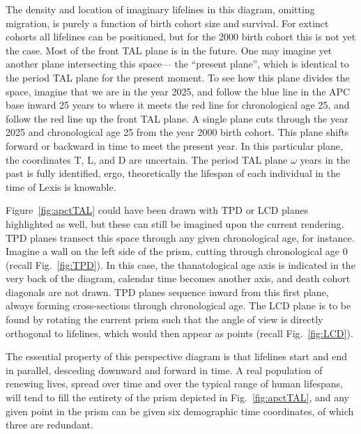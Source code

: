 \documentclass[12pt,oneside,a4paper,doublespacing]{article} %
\theoremstyle{definition}
\begin{document}
The density and location of imaginary lifelines in this diagram, omitting
migration, is purely a function of birth cohort size and survival. For extinct
cohorts all lifelines can be positioned, but for the 2000 birth cohort this is
not yet the case. Most of the front TAL plane is in the future. One may imagine
yet another plane intersecting this space--- the ``present plane'', which is
identical to the period TAL plane for the present moment. To see how this plane
divides the space, imagine that we are in the year 2025, and follow the blue
line in the APC base inward 25 years to where it meets the red line for chronological age 25, and follow the
red line up the front TAL plane. A single plane cuts through the year
2025 and chronological age 25 from the year 2000 birth cohort. This plane
shifts forward or backward in time to meet the present year. In this particular
plane, the coordinates T, L, and D are uncertain. The period TAL plane $\omega$
years in the past is fully identified, ergo, theoretically the lifespan of each
individual in the time of Lexis is knowable. 

Figure~\ref{fig:apctTAL} could have been drawn with TPD or LCD planes highlighted
as well, but these can still be imagined upon the current rendering. TPD planes
transect this space through any given chronological age, for instance. Imagine a
wall on the left side of the prism, cutting through chronological age 0 (recall
Fig.~\ref{fig:TPD}).
In this case, the thanatological age axis is indicated in the very back of the diagram,
calendar time becomes another axis, and death cohort diagonals are not drawn.
TPD planes sequence inward from this first plane, always forming cross-sections
through chronological age. The LCD plane is to be found by rotating the current
prism such that the angle of view is directly orthogonal to lifelines, which
would then appear as points (recall Fig.~\ref{fig:LCD}).

The essential property of this perspective diagram is that lifelines
start and end in parallel, desceding downward and forward in time. A real
population of renewing lives, spread over time and over the typical range of
human lifespans, will tend to fill the entirety of the prism depicted in
Fig.~\ref{fig:apctTAL}, and any given point in the prism can be given six
demographic time coordinates, of which three are redundant.

\FloatBarrier
\end{document}
